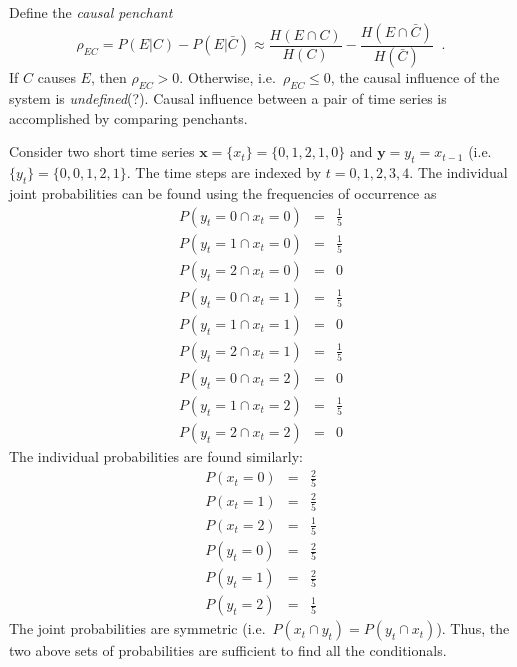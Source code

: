 \documentclass[a4paper,11pt]{article}
\begin{document}
Define the {\em causal penchant} 
$$
\rho_{EC} = P\left(E|C\right) - P\left(E|\bar{C}\right) \approx \frac{H\left(E\cap C\right)}{H(C)}-\frac{H\left(E\cap \bar{C}\right)}{H(\bar{C})}\;\;.
$$
If $C$ causes $E$, then $\rho_{EC} > 0$.  Otherwise, i.e.\ $\rho_{EC} \le 0$, the causal influence of the system is {\em undefined}(?).  Causal influence between a pair of time series is accomplished by comparing penchants.

Consider two short time series $\mathbf{x}=\{x_t\} = \{0,1,2,1,0\}$ and $\mathbf{y}=y_t=x_{t-1}$ (i.e.\ $\{y_t\} = \{0,0,1,2,1\}$.  The time steps are indexed by $t=0,1,2,3,4$.  The individual joint probabilities can be found using the frequencies of occurrence as
\begin{eqnarray}
P(y_t=0 \cap x_t = 0) &=& \frac{1}{5}\\
P(y_t=1 \cap x_t = 0) &=& \frac{1}{5}\\
P(y_t=2 \cap x_t = 0) &=& 0\\
P(y_t=0 \cap x_t = 1) &=& \frac{1}{5}\\
P(y_t=1 \cap x_t = 1) &=& 0\\
P(y_t=2 \cap x_t = 1) &=& \frac{1}{5}\\
P(y_t=0 \cap x_t = 2) &=& 0\\
P(y_t=1 \cap x_t = 2) &=& \frac{1}{5}\\
P(y_t=2 \cap x_t = 2) &=& 0
\end{eqnarray}
The individual probabilities are found similarly:
\begin{eqnarray}
P(x_t = 0) &=& \frac{2}{5}\\
P(x_t = 1) &=& \frac{2}{5}\\
P(x_t = 2) &=& \frac{1}{5}\\
P(y_t = 0) &=& \frac{2}{5}\\
P(y_t = 1) &=& \frac{2}{5}\\
P(y_t = 2) &=& \frac{1}{5}
\end{eqnarray}
The joint probabilities are symmetric (i.e.\ $P(x_t\cap y_t) = P(y_t\cap x_t)$).  Thus, the two above sets of probabilities are sufficient to find all the conditionals.  
\end{document}

